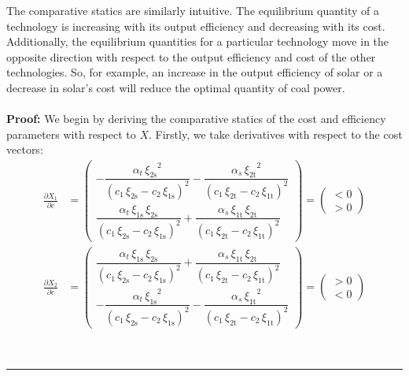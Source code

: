 \documentclass[12pt,a4paper]{extarticle}
\newenvironment{proof}[1][Proof]{\noindent\textbf{#1:} }{\ \rule{0.5em}{0.5em}}
\begin{document}
The comparative statics are similarly intuitive. The equilibrium quantity of a technology is increasing with its output efficiency and decreasing with its cost. Additionally, the equilibrium quantities for a particular technology move in the opposite direction with respect to the output efficiency and cost of the other technologies. So, for example, an increase in the output efficiency of solar or a decrease in solar's cost will reduce the optimal quantity of coal power. 
\hfill \\\\
\begin{proof}
We begin by deriving the comparative statics of the cost and efficiency parameters with respect to $X$.   Firstly, we take derivatives with respect to the cost vectors:
\begin{align*}
\frac{\partial X_1}{\partial c} &= 
\begin{pmatrix}
-\dfrac{\alpha _{t}\,{\xi _{\mathrm{2s}}}^2}{{\left(c_{1}\,\xi _{\mathrm{2s}}-c_{2}\,\xi _{\mathrm{1s}}\right)}^2}-\dfrac{\alpha _{s}\,{\xi _{\mathrm{2t}}}^2}{{\left(c_{1}\,\xi _{\mathrm{2t}}-c_{2}\,\xi _{\mathrm{1t}}\right)}^2} \\
\dfrac{\alpha _{t}\,\xi _{\mathrm{1s}}\,\xi _{\mathrm{2s}}}{{\left(c_{1}\,\xi _{\mathrm{2s}}-c_{2}\,\xi _{\mathrm{1s}}\right)}^2}+\dfrac{\alpha _{s}\,\xi _{\mathrm{1t}}\,\xi _{\mathrm{2t}}}{{\left(c_{1}\,\xi _{\mathrm{2t}}-c_{2}\,\xi _{\mathrm{1t}}\right)}^2}
\end{pmatrix}
=
\begin{pmatrix}
< 0 \\
> 0 
\end{pmatrix} \\
\frac{\partial X_2}{\partial c} &= 
\begin{pmatrix}
\dfrac{\alpha _{t}\,\xi _{\mathrm{1s}}\,\xi _{\mathrm{2s}}}{{\left(c_{1}\,\xi _{\mathrm{2s}}-c_{2}\,\xi _{\mathrm{1s}}\right)}^2}+\dfrac{\alpha _{s}\,\xi _{\mathrm{1t}}\,\xi _{\mathrm{2t}}}{{\left(c_{1}\,\xi _{\mathrm{2t}}-c_{2}\,\xi _{\mathrm{1t}}\right)}^2} \\
-\dfrac{\alpha _{t}\,{\xi _{\mathrm{1s}}}^2}{{\left(c_{1}\,\xi _{\mathrm{2s}}-c_{2}\,\xi _{\mathrm{1s}}\right)}^2}-\dfrac{\alpha _{s}\,{\xi _{\mathrm{1t}}}^2}{{\left(c_{1}\,\xi _{\mathrm{2t}}-c_{2}\,\xi _{\mathrm{1t}}\right)}^2}
\end{pmatrix}
=
\begin{pmatrix}
> 0 \\
< 0 
\end{pmatrix}
\end{align*}

\end{proof}
\end{document}
